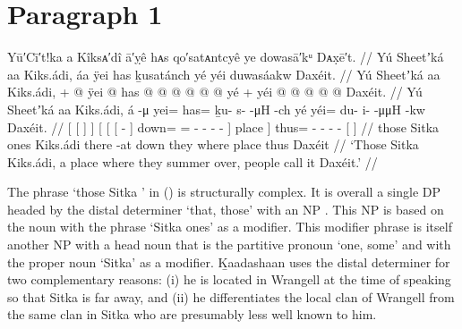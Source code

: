 \clearpage
\section{Paragraph 1}\label{sec:100-para-1}

\ex\label{ex:100-1-sitka-summer-over}%
%
\begingl
	\glpreamble	Yū′Cī′t!ka a Kîksᴀ′dî ā′ỵê hᴀs qo′satᴀntcyê ye dowasā′kᵘ Dᴀx̣ē′t. //
	\glpreamble	Yú Sheetʼká aa Kiks.ádi, áa ÿei has ḵusatánch yé yéi duwasáakw Daxéit. //
	\gla	{} Yú {} Sheetʼká aa {} Kiks.ádi, {} +
		{} {} {}  @ {} {}
				ÿei @ has @  @ {} @ {} @ {} @ {} @ {} {} yé {} +
		yéi @  @ {} @ {} @ {} @ {} {} Daxéit. {} //
	\glb	{} Yú {} Sheetʼká aa {} Kiks.ádi, {}
			{} {} {} á -μ {}
				yei= has= ḵu- s-  -μH -ch {} {} yé {}
		yéi= du- i-  -μμH -kw {} Daxéit. {} //
	\glc	{}[  {}[   {}]  {}]
		{}[	{}[ {}[  - {}]
				down= = - -
					 - - \· {}] place {}]
		thus= - -  - -
		{}[  {}] //
	\gld	{} those {} Sitka ones {} Kiks.ádi {}
		{} {} {} there -at {}
				down they  {} {} {} {} \·where {} place {}
		thus  {} {} {} {}
		{} Daxéit {} //
	\glft	‘Those Sitka Kiks.ádi, a place where they summer over, people call it Daxéit.’
		//
\endgl
\xe

The phrase  ‘those Sitka ’ in (\lastx) is structurally complex.
It is overall a single DP headed by the distal determiner  ‘that, those’ with an NP .
This NP is based on the noun  with the phrase  ‘Sitka ones’ as a modifier.
This modifier phrase is itself another NP with a head noun that is the partitive pronoun  ‘one, some’ and with the proper noun  ‘Sitka’ as a modifier.
Ḵaadashaan uses the distal determiner  for two complementary reasons: (i) he is located in Wrangell at the time of speaking so that Sitka is far away, and (ii) he differentiates the local  clan of Wrangell from the same clan in Sitka who are presumably less well known to him.

